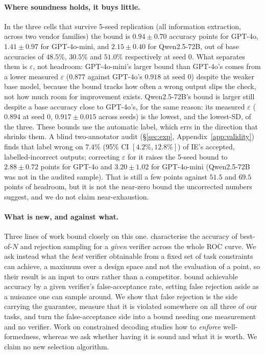 \documentclass[11pt]{article}
\begin{document}
\paragraph{Where soundness holds, it buys little.} In the three cells that
survive 5-seed replication (all information extraction, across two vendor
families) the bound is
$0.94\pm0.70$ accuracy points for GPT-4o, $1.41\pm0.97$ for
GPT-4o-mini, and $2.15\pm0.40$ for Qwen2.5-72B, out of base accuracies of $48.5\%$, $30.5\%$
and $51.0\%$ respectively at
seed 0. What separates them is $\varepsilon$, not
headroom: GPT-4o-mini's larger bound than GPT-4o's comes from a lower measured
$\varepsilon$ ($0.877$ against GPT-4o's $0.918$ at seed 0) despite the
weaker base model, because the bound tracks how often a wrong output slips
the check, not how much room for improvement exists. Qwen2.5-72B's bound is
larger still despite a base accuracy close to GPT-4o's, for the same
reason: its measured $\varepsilon$ ($0.894$ at seed 0, $0.917\pm0.015$
across seeds) is the lowest, and the lowest-SD, of the three.
These bounds use the automatic label, which errs in the direction that
shrinks them. A blind two-annotator audit (\S\ref{sec:exp}, Appendix~\ref{app:validity})
finds that label wrong on $7.4\%$ (95\% CI $[4.2\%,12.8\%]$) of IE's accepted,
labelled-incorrect outputs; correcting $\varepsilon$ for it raises the 5-seed
bound to $2.88\pm0.72$ points for GPT-4o and $3.20\pm1.02$ for GPT-4o-mini
(Qwen2.5-72B was not in the audited sample). That is still a few points
against $51.5$ and $69.5$ points of headroom, but it is not the near-zero
bound the uncorrected numbers suggest, and we do not claim near-exhaustion.

\paragraph{What is new, and against what.} Three lines of work bound closely on
this one. \citet{dorner2025rocnreroll} characterise the accuracy of best-of-$N$
and rejection sampling for a \emph{given} verifier across the whole ROC curve. We
ask instead what the \emph{best} verifier obtainable from a fixed set of task
constraints can achieve, a maximum over a design space and not the evaluation of
a point, so their result is an input to ours rather than a competitor.
\citet{stroebl2024verifier} bound achievable accuracy by a given verifier's
false-acceptance rate, setting false rejection aside as a nuisance one can sample
around. We show that false rejection is the side carrying the guarantee, measure
that it is violated somewhere on all three of our tasks, and turn the false-acceptance side
into a bound needing one measurement and no verifier. Work on constrained decoding
\citep{geng2023grammar,park2024grammar,tam2024format} studies how to
\emph{enforce} well-formedness, whereas we ask whether having it is sound and
what it is worth. We claim no new selection algorithm.
\end{document}
